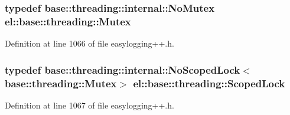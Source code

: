 \subsubsection[{Mutex}]{\setlength{\rightskip}{0pt plus 5cm}typedef {\bf base\+::threading\+::internal\+::\+No\+Mutex} {\bf el\+::base\+::threading\+::\+Mutex}}\label{namespaceel_1_1base_1_1threading_ab9400eb234a82878e8458a65f9774320}


Definition at line 1066 of file easylogging++.\+h.

\hypertarget{namespaceel_1_1base_1_1threading_a84bb1940fe98386c8907c1f4ceac5718}{}
\subsubsection[{Scoped\+Lock}]{\setlength{\rightskip}{0pt plus 5cm}typedef {\bf base\+::threading\+::internal\+::\+No\+Scoped\+Lock}$<${\bf base\+::threading\+::\+Mutex}$>$ {\bf el\+::base\+::threading\+::\+Scoped\+Lock}}\label{namespaceel_1_1base_1_1threading_a84bb1940fe98386c8907c1f4ceac5718}


Definition at line 1067 of file easylogging++.\+h.

